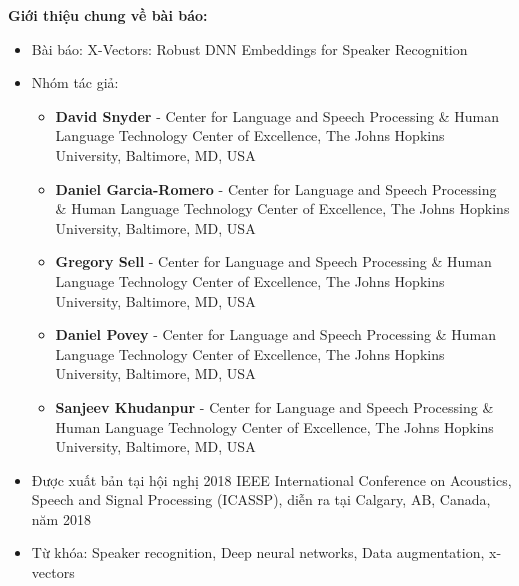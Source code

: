 \documentclass{article}
\begin{document}
	\textbf{Giới thiệu chung về bài báo:}
	\begin{itemize}
		\item Bài báo: X-Vectors: Robust DNN Embeddings for Speaker Recognition
		\item Nhóm tác giả: 
			\begin{itemize}
				\item \textbf{David Snyder} - Center for Language and Speech Processing \& Human Language Technology Center of Excellence, The Johns Hopkins University, Baltimore, MD, USA
				\item \textbf{Daniel Garcia-Romero} - Center for Language and Speech Processing \& Human Language Technology Center of Excellence, The Johns Hopkins University, Baltimore, MD, USA
				\item \textbf{Gregory Sell} - Center for Language and Speech Processing \& Human Language Technology Center of Excellence, The Johns Hopkins University, Baltimore, MD, USA
				\item \textbf{Daniel Povey} - Center for Language and Speech Processing \& Human Language Technology Center of Excellence, The Johns Hopkins University, Baltimore, MD, USA
				\item \textbf{Sanjeev Khudanpur} - Center for Language and Speech Processing \& Human Language Technology Center of Excellence, The Johns Hopkins University, Baltimore, MD, USA
			\end{itemize}
		\item Được xuất bản tại hội nghị 2018 IEEE International Conference on Acoustics, Speech and Signal Processing (ICASSP), diễn ra tại Calgary, AB, Canada, năm 2018
		\item Từ khóa: Speaker recognition, Deep neural networks, Data augmentation, x-vectors
	\end{itemize}
	
\end{document}
